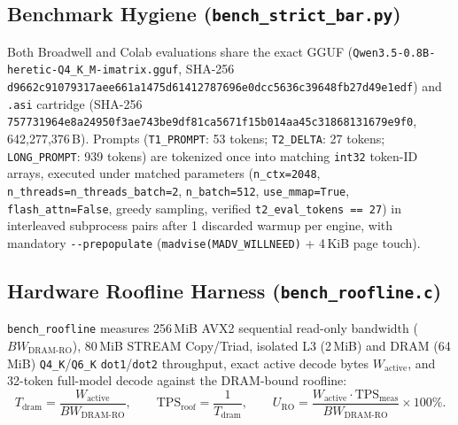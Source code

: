 \documentclass[11pt,a4paper]{article}
\begin{document}
\subsection{Benchmark Hygiene (\texttt{bench\_strict\_bar.py})}
Both Broadwell and Colab evaluations share the exact GGUF (\texttt{Qwen3.5-0.8B-heretic-Q4\_K\_M-imatrix.gguf}, SHA-256 \texttt{d9662c91079317aee661a1475d61412787696e0dcc5636c39648fb27d49e1edf}) and \texttt{.asi} cartridge (SHA-256 \texttt{757731964e8a24950f3ae743be9df81ca5671f15b014aa45c31868131679e9f0}, 642,277,376\,B). Prompts (\texttt{T1\_PROMPT}: 53 tokens; \texttt{T2\_DELTA}: 27 tokens; \texttt{LONG\_PROMPT}: 939 tokens) are tokenized once into matching \texttt{int32} token-ID arrays, executed under matched parameters (\texttt{n\_ctx=2048}, \texttt{n\_threads=n\_threads\_batch=2}, \texttt{n\_batch=512}, \texttt{use\_mmap=True}, \texttt{flash\_attn=False}, greedy sampling, verified \texttt{t2\_eval\_tokens == 27}) in interleaved subprocess pairs after 1 discarded warmup per engine, with mandatory \texttt{-{}-prepopulate} (\texttt{madvise(MADV\_WILLNEED)} + 4\,KiB page touch).

\subsection{Hardware Roofline Harness (\texttt{bench\_roofline.c})}
\texttt{bench\_roofline} measures 256\,MiB AVX2 sequential read-only bandwidth ($BW_{\mathrm{DRAM\text{-}RO}}$), 80\,MiB STREAM Copy/Triad, isolated L3 (2\,MiB) and DRAM (64\,MiB) \texttt{Q4\_K}/\texttt{Q6\_K} \texttt{dot1}/\texttt{dot2} throughput, exact active decode bytes $W_{\mathrm{active}}$, and 32-token full-model decode against the DRAM-bound roofline:
\begin{equation}
\label{eq:roofline}
T_{\mathrm{dram}} = \frac{W_{\mathrm{active}}}{BW_{\mathrm{DRAM\text{-}RO}}},\qquad
\mathrm{TPS}_{\mathrm{roof}} = \frac{1}{T_{\mathrm{dram}}},\qquad
U_{\mathrm{RO}} = \frac{W_{\mathrm{active}} \cdot \mathrm{TPS}_{\mathrm{meas}}}{BW_{\mathrm{DRAM\text{-}RO}}} \times 100\%.
\end{equation}
\end{document}
